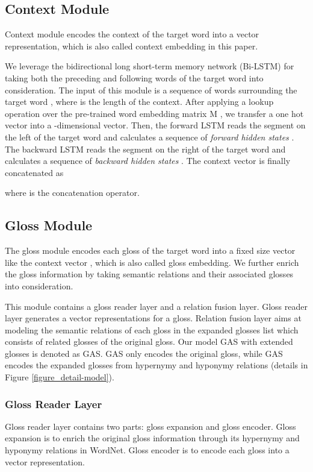 \documentclass[11pt,a4paper]{article}
\begin{document}
\subsection{Context Module} \label{subsec:ContextModule}
Context module encodes the context of the target word into a vector representation, which is also called context embedding in this paper.

We leverage the bidirectional long short-term memory network (Bi-LSTM) for taking both the preceding and following words of the target word into consideration.
The input of this module  is a sequence of words surrounding the target word , where  is the length of the context.
After applying a lookup operation over the pre-trained word embedding matrix M , we transfer a one hot vector  into a -dimensional vector.
Then, the forward LSTM reads the segment  on the left of the target word  and calculates a sequence of {\em forward hidden states} .
The backward LSTM reads the segment  on the right of the target word  and calculates a sequence of {\em backward hidden states} .
The context vector  is finally concatenated as

where  is the concatenation operator.

\subsection{Gloss Module} \label{subsec:GlossModule}
The gloss module encodes each gloss of the target word into a fixed size vector like the context vector , which is also called gloss embedding.
We further enrich the gloss information by taking semantic relations and their associated glosses into consideration.


This module contains a gloss reader layer and a relation fusion layer.
Gloss reader layer generates a vector representations for a gloss.
Relation fusion layer aims at modeling the semantic relations of each gloss in the expanded glosses list which consists of related glosses of the original gloss.
Our model GAS with extended glosses is denoted as GAS.
GAS only encodes the original gloss, while GAS encodes the expanded glosses from hypernymy and hyponymy relations (details
in Figure \ref{figure_detail-model}).


\subsubsection{Gloss Reader Layer}
Gloss reader layer contains two parts: gloss expansion and gloss encoder.
Gloss expansion is to enrich the original gloss information through its hypernymy and hyponymy relations in WordNet.
Gloss encoder is to encode each gloss into a vector representation.
\end{document}

